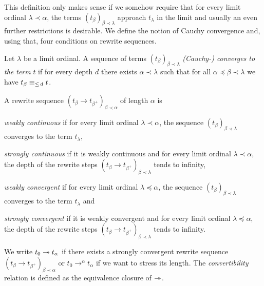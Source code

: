 This definition only makes sense if we somehow require that for every limit
ordinal $\lambda \prec \alpha$, the terms $(t_\beta)_{\beta \prec
  \lambda}$ approach $t_\lambda$ in the limit and usually an even
further restrictions is desirable. We define the notion of Cauchy
convergence and, using that, four conditions on rewrite sequences.

\begin{definition}\label{def:cauchy}%
  Let $\lambda$ be a limit ordinal. A sequence of terms
  $(t_\beta)_{\beta \prec \lambda}$ \emph{(Cauchy-) converges to the
    term} $t$ if for every depth $d$ there exists $\alpha \prec
  \lambda$ such that for all $\alpha \preceq \beta \prec \lambda$ we
  have $t_\beta \equiv_{\le \, d} t$.
\end{definition}

\begin{definition}\label{def:convergence}%
A rewrite sequence $(t_\beta \rightarrow t_{\beta^+})_{\beta \prec
  \alpha}$ of length $\alpha$ is
\begin{compactenum}
  \item
    \emph{weakly continuous} if for every limit ordinal $\lambda \prec
    \alpha$, the sequence $(t_\beta)_{\beta \prec \lambda}$ converges
    to the term $t_\lambda$,
  \item
    \emph{strongly continuous} if it is weakly continuous and for every limit
    ordinal $\lambda \prec \alpha$, the depth of the rewrite steps $(t_\beta
    \rightarrow t_{\beta^+})_{\beta \prec \lambda}$ tends to infinity,
  \item
    \emph{weakly convergent} if for every limit ordinal $\lambda
    \preceq \alpha$, the sequence $(t_\beta)_{\beta \prec \lambda}$
    converges to the term $t_\lambda$ and
  \item
    \emph{strongly convergent} if it is weakly convergent and for
    every limit ordinal $\lambda \preceq \alpha$, the depth of the
    rewrite steps $(t_\beta \rightarrow t_{\beta^+})_{\beta \prec
      \lambda}$ tends to infinity.
\end{compactenum}
\end{definition}

We write $t_0 \twoheadrightarrow t_\alpha$ if there exists a strongly
convergent rewrite sequence $(t_\beta \rightarrow t_{\beta^+})_{\beta
  \prec \alpha}$ or $t_0 \rightarrow^\alpha t_\alpha$ if we want to
stress its length. The \emph{convertibility} relation is defined as
the equivalence closure of $\twoheadrightarrow$.


